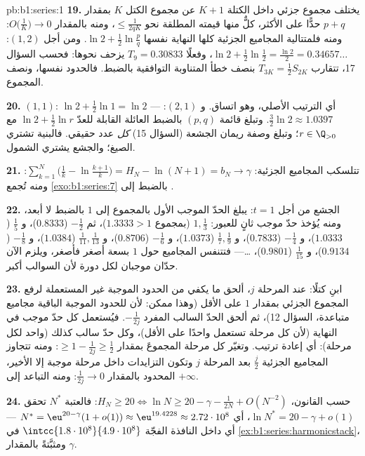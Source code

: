 \begin{solution}{pb:b1:series:1}
\textbf{19.} يختلف مجموع جزئي داخل الكتلة $K + 1$ عن
مجموع الكتل $K$ بمقدار $p + q$ حدًّا على الأكثر، كلٌّ منها قيمته المطلقة
نحو $\leq \frac{1}{2qK}$، ومنه بالمقدار $O\bigl(\frac1K\bigr) \to 0$:
ومنه فلمتتالية المجاميع الجزئية كلها النهاية نفسها $\ln 2 +
\frac12\ln\frac pq$. ومن أجل $(1, 2)$: $\ln 2 + \frac12\ln\frac12 =
\frac{\ln 2}{2} = 0.34657\dots$، وفعلًا $T_9 = 0.30833$
يزحف نحوها: فحسب السؤال 17، تتقارب $T_{3K} = \frac12 S_{2K}$
بنصف خطأ المتناوبة التوافقية بالضبط.
فالحدود نفسها، ونصف المجموع.

\textbf{20.} $(1,1)$: $\ln 2 + \frac12\ln 1 = \ln 2$ --- أي
الترتيب الأصلي، وهو اتساق. و $(2,1)$: $\frac32\ln 2 \approx
1.0397$. وتبلغ قائمة $(p,q)$ بالضبط العائلة  القابلة
للعدّ $\ln 2 + \frac12\ln r$ مع $r \in \Q_{>0}$؛ وتبلغ وصفة ريمان
الجشعة (السؤال 15) \emph{كل} عدد حقيقي. فالبنية تشتري
الصيغ؛ والجشع يشتري الشمول.

\textbf{21.} تتلسكب المجاميع الجزئية: $\sum_{k=1}^{N}
\bigl(\frac1k - \ln\frac{k+1}{k}\bigr) = H_N - \ln(N+1) = b_N
\to \gamma$: ومنه تُجمع  \cref{exo:b1:series:7} بالضبط
إلى .

\textbf{22.} الجشع من أجل $t = 1$: يبلغ الحدّ الموجب الأول
بالمجموع إلى $1$ بالضبط لا أبعد، ومنه يُؤخذ حدّ موجب ثانٍ
للعبور: $1, \frac13$ (بمجموع $1.3333 > 1$)، ثم
$-\frac12$ ($0.8333$)، و $\frac15$ ($1.0333$)، و $-\frac14$
($0.7833$)، و $\frac17, \frac19$ ($1.0373$)، و $-\frac16$
($0.8706$)، و $\frac1{11}, \frac1{13}$ ($1.0384$)، و $-\frac18$
($0.9134$)، و $\frac1{15}$ ($0.9801$)، \dots --- فتتنفس المجاميع
حول $1$ بسعة أصغر فأصغر، ويلزم الآن حدّان موجبان
لكل دورة لأن السوالب أكبر.

\textbf{23.} ابنِ كتلًا: عند المرحلة $j$، ألحق ما يكفي من الحدود
الموجبة غير المستعملة لرفع المجموع الجزئي بمقدار $1$ على الأقل
(وهذا ممكن: لأن للحدود الموجبة الباقية مجاميع متباعدة،
السؤال 12)، ثم ألحق الحدّ السالب المفرد $-\frac{1}
{2j}$. فيُستعمل كل حدّ موجب في النهاية (لأن كل مرحلة تستعمل
واحدًا على الأقل)، وكل حدّ سالب كذلك (واحد لكل مرحلة): أي
إعادة ترتيب. وتغيّر كل مرحلة المجموعَ بمقدار $\geq 1 -
\frac{1}{2j} \geq \frac12$: ومنه تتجاوز المجاميع الجزئية
$\frac{j}{2}$ بعد المرحلة $j$ وتكون التزايدات داخل مرحلة
موجبة إلا الأخير، المحدود بالمقدار $\frac{1}{2j} \to 0$: ومنه
التباعد إلى $+\infty$.

\textbf{24.} حسب القانون، $H_N \geq 20 \iff \ln N \geq 20 -
\gamma - \frac{1}{2N} + O(N^{-2})$: فالعتبة $N^*$
تحقق $\ln N^* = 20 - \gamma + o(1)$، أي $N^* =
\eu^{20 - \gamma}(1 + o(1)) \approx \eu^{19.4228} \approx
2.72\cdot10^{8}$ --- أي داخل النافذة الفجّة
$\intcc{1.8\cdot10^8}{4.9\cdot10^8}$ في
\cref{ex:b1:series:harmonicstack}، ومثبَّتةً بالمقدار $\gamma$.


\end{solution}
